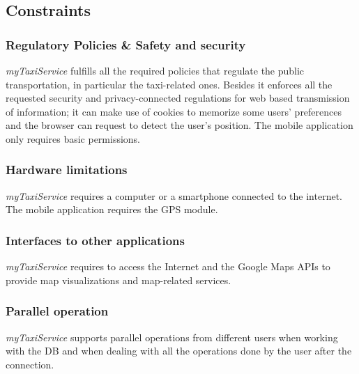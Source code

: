 \documentclass[a4paper,11pt]{report} %
\newcommand{\mts}{\mbox{\normalfont\itshape myTaxiService}}
\begin{document}
	\subsection{Constraints}
	
	\subsubsection{Regulatory Policies \& Safety and security} \mts{} fulfills all the required policies that regulate the public transportation, in particular the taxi-related ones. Besides it enforces all the requested security and privacy-connected regulations for web based transmission of information; it can make use of cookies to memorize some users' preferences and the browser can request to detect the user's position. The mobile application only requires basic permissions. 
	
	\subsubsection{Hardware limitations} \mts{} requires a computer or a smartphone connected to the internet. The mobile application requires the GPS module.   
	
	\subsubsection{Interfaces to other applications} \mts{} requires to access the Internet and the Google Maps APIs to provide map visualizations and map-related services.
	
	\subsubsection{Parallel operation} \mts{} supports parallel operations from different users when working with the DB and when dealing with all the operations done by the user after the connection.
	
	\pagebreak
	
\end{document}
